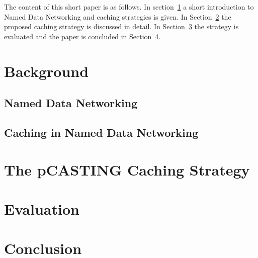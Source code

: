 \documentclass[conference]{IEEEtran}
\begin{document}
The content of this short paper is as follows. In section~\ref{sec:background} a short introduction to Named Data Networking and caching strategies is given. In Section~\ref{sec:pcasting} the proposed caching strategy is discussed in detail. In Section~\ref{sec:eval} the strategy is evaluated and the paper is concluded in Section~\ref{sec:conclusion}.

\section{Background}
\label{sec:background}

\subsection{Named Data Networking}

\subsection{Caching in Named Data Networking}

\section{The pCASTING Caching Strategy}
\label{sec:pcasting}

\section{Evaluation}
\label{sec:eval}

\section{Conclusion}
\label{sec:conclusion}
\end{document}

